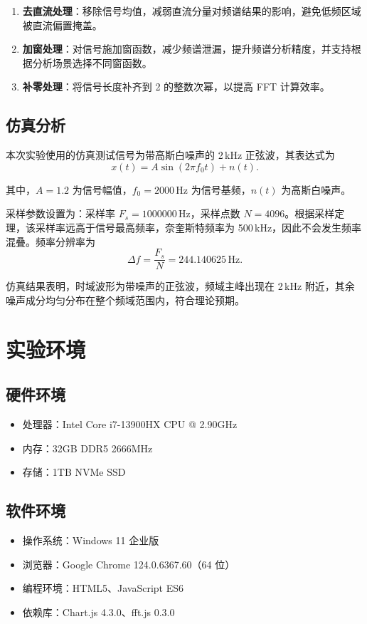 \documentclass[11pt,a4paper]{ctexart}
\begin{document}
\begin{enumerate}
  \item \textbf{去直流处理}：移除信号均值，减弱直流分量对频谱结果的影响，避免低频区域被直流偏置掩盖。
  \item \textbf{加窗处理}：对信号施加窗函数，减少频谱泄漏，提升频谱分析精度，并支持根据分析场景选择不同窗函数。
  \item \textbf{补零处理}：将信号长度补齐到 2 的整数次幂，以提高 FFT 计算效率。
\end{enumerate}

\subsection{仿真分析}

本次实验使用的仿真测试信号为带高斯白噪声的 2\,kHz 正弦波，其表达式为
\[
x(t) = A \sin(2\pi f_0 t) + n(t).
\]

其中，$A = 1.2$ 为信号幅值，$f_0 = 2000\,\text{Hz}$ 为信号基频，$n(t)$ 为高斯白噪声。

采样参数设置为：采样率 $F_s = 1000000\,\text{Hz}$，采样点数 $N = 4096$。根据采样定理，该采样率远高于信号最高频率，奈奎斯特频率为 500\,kHz，因此不会发生频率混叠。频率分辨率为
\[
\Delta f = \frac{F_s}{N} = 244.140625\,\text{Hz}.
\]

仿真结果表明，时域波形为带噪声的正弦波，频域主峰出现在 2\,kHz 附近，其余噪声成分均匀分布在整个频域范围内，符合理论预期。

\section{实验环境}

\subsection{硬件环境}

\begin{itemize}
  \item 处理器：Intel Core i7-13900HX CPU @ 2.90GHz
  \item 内存：32GB DDR5 2666MHz
  \item 存储：1TB NVMe SSD
\end{itemize}

\subsection{软件环境}

\begin{itemize}
  \item 操作系统：Windows 11 企业版
  \item 浏览器：Google Chrome 124.0.6367.60（64 位）
  \item 编程环境：HTML5、JavaScript ES6
  \item 依赖库：Chart.js 4.3.0、fft.js 0.3.0
\end{itemize}
\end{document}
